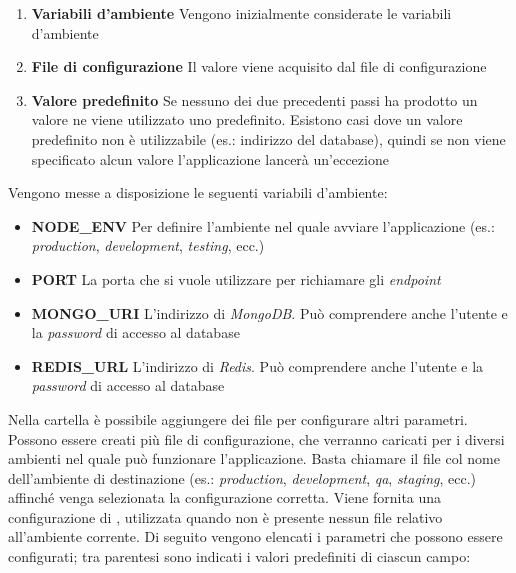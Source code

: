 \begin{enumerate}
	\item \textbf{Variabili d'ambiente}
	Vengono inizialmente considerate le variabili d'am\-bien\-te
	\item \textbf{File di configurazione}
	Il valore viene acquisito dal file di configurazione
	\item \textbf{Valore predefinito}
	Se nessuno dei due precedenti passi ha prodotto un valore ne viene utilizzato uno predefinito. Esistono casi dove un valore predefinito non è utilizzabile (es.: indirizzo del database), quindi se non viene specificato alcun valore l'applicazione lancerà un'eccezione
\end{enumerate}

Vengono messe a disposizione le seguenti variabili d'ambiente:

\begin{itemize}
	\item \textbf{NODE\_ENV}
	Per definire l'ambiente nel quale avviare l'applicazione (es.: \emph{production}, \emph{development}, \emph{testing}, ecc.)
	\item \textbf{PORT}
	La porta che si vuole utilizzare per richiamare gli \emph{endpoint}
	\item \textbf{MONGO\_URI}
	L'indirizzo di \emph{MongoDB}. Può comprendere anche l'utente e la \emph{password} di accesso al database
	\item \textbf{REDIS\_URL}
	L'indirizzo di \emph{Redis}. Può comprendere anche l'utente e la \emph{password} di accesso al database
\end{itemize}

Nella cartella  è possibile aggiungere dei file per configurare altri parametri. Possono essere creati più file di configurazione, che verranno caricati per i diversi ambienti nel quale può funzionare l'applicazione. Basta chiamare il file col nome dell'ambiente di destinazione (es.: \emph{production}, \emph{development}, \emph{qa}, \emph{staging}, ecc.) affinché venga selezionata la configurazione corretta. Viene fornita una configurazione di , utilizzata quando non è presente nessun file relativo all'ambiente corrente. Di seguito vengono elencati i parametri che possono essere configurati; tra parentesi sono indicati i valori predefiniti di ciascun campo:

